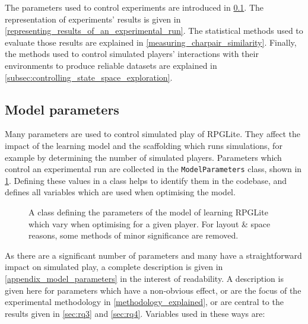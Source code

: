The parameters used to control experiments are introduced in
\cref{model_parameters}. The representation of experiments' results is given in
\cref{representing_results_of_an_experimental_run}. The statistical methods used
to evaluate those results are explained in \cref{measuring_charpair_similarity}.
Finally, the methods used to control simulated players' interactions with their
environments to produce reliable datasets are explained in
\cref{subsec:controlling_state_space_exploration}.



\subsection{Model parameters}
\label{model_parameters}

Many parameters are used to control simulated play of RPGLite. They affect the
impact of the learning model and the scaffolding which runs simulations, for
example by determining the number of simulated players. Parameters which control
an experimental run are collected in the \lstinline{ModelParameters} class,
shown in \cref{fig:model_parameters_class}. Defining these values in a class
helps to identify them in the codebase, and defines all variables which are used
when optimising the model.

\begin{figure}[tp]
    \centering
    
    \caption{A class defining the parameters of the model of learning RPGLite which vary when optimising for a given player. For layout \& space reasons, some methods of minor significance are removed.}
    \label{fig:model_parameters_class}
\end{figure}

As there are a significant number of parameters and many have a straightforward
impact on simulated play, a complete description is given in
\cref{appendix_model_parameters} in the interest of readability. A description
is given here for parameters which have a non-obvious effect, or are the focus
of the experimental methodology in \cref{methodology_explained}, or are central
to the results given in \cref{sec:rq3} and \cref{sec:rq4}. Variables used in
these ways are:

